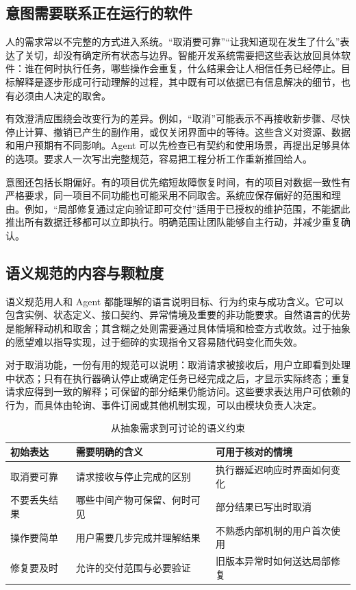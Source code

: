 \label{sec:intent}
\subsection{意图需要联系正在运行的软件}
人的需求常以不完整的方式进入系统。“取消要可靠”“让我知道现在发生了什么”表达了关切，却没有确定所有状态与边界。智能开发系统需要把这些表达放回具体软件：谁在何时执行任务，哪些操作会重复，什么结果会让人相信任务已经停止。目标解释是逐步形成可行动理解的过程，其中既有可以依据已有信息解决的细节，也有必须由人决定的取舍。

有效澄清应围绕会改变行为的差异。例如，“取消”可能表示不再接收新步骤、尽快停止计算、撤销已产生的副作用，或仅关闭界面中的等待。这些含义对资源、数据和用户预期有不同影响。Agent 可以先检查已有契约和使用场景，再提出足够具体的选项。要求人一次写出完整规范，容易把工程分析工作重新推回给人。

意图还包括长期偏好。有的项目优先缩短故障恢复时间，有的项目对数据一致性有严格要求，同一项目不同功能也可能采用不同取舍。系统应保存偏好的范围和理由。例如，“局部修复通过定向验证即可交付”适用于已授权的维护范围，不能据此推出所有数据迁移都可以立即执行。明确范围让团队能够自主行动，并减少重复确认。

\subsection{语义规范的内容与颗粒度}
语义规范用人和 Agent 都能理解的语言说明目标、行为约束与成功含义。它可以包含实例、状态定义、接口契约、异常情境及重要的非功能要求。自然语言的优势是能解释动机和取舍；其含糊之处则需要通过具体情境和检查方式收敛。过于抽象的愿望难以指导实现，过于细碎的实现指令又容易随代码变化而失效。

对于取消功能，一份有用的规范可以说明：取消请求被接收后，用户立即看到处理中状态；只有在执行器确认停止或确定任务已经完成之后，才显示实际终态；重复请求应得到一致的解释；可保留的部分结果仍能访问。这些要求表达用户可依赖的行为，而具体由轮询、事件订阅或其他机制实现，可以由模块负责人决定。

\begin{table}[htbp]\centering\small
\caption{从抽象需求到可讨论的语义约束}\label{tab:intent}
\begin{tabularx}{\linewidth}{p{2.7cm}YY}\toprule
初始表达 & 需要明确的含义 & 可用于核对的情境\\\midrule
取消要可靠 & 请求接收与停止完成的区别 & 执行器延迟响应时界面如何变化\\
不要丢失结果 & 哪些中间产物可保留、何时可见 & 部分结果已写出时取消\\
操作要简单 & 用户需要几步完成并理解结果 & 不熟悉内部机制的用户首次使用\\
修复要及时 & 允许的交付范围与必要验证 & 旧版本异常时如何送达局部修复\\\bottomrule
\end{tabularx}\end{table}

